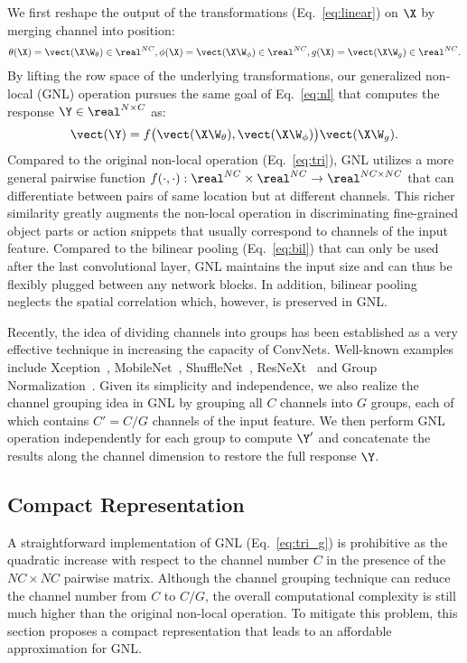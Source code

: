 \documentclass{article}
\begin{document}
We first reshape the output of the transformations (Eq.~\ref{eq:linear}) on $\X$ by merging channel into position:
\begin{align}
  \label{eq:linear_g}
  \theta(\X) = \vect(\X \W_\theta) \in \real^{NC}, \phi(\X) = \vect(\X \W_\phi) \in \real^{NC}, g(\X) = \vect(\X \W_g) \in \real^{NC} .
\end{align}
By lifting the row space of the underlying transformations, our generalized non-local (GNL) operation pursues the same goal of Eq.~\ref{eq:nl} that computes the response $\Y \in \real^{N \times C}$ as:
\begin{align}
  \label{eq:tri_g}
  \vect(\Y) = f \big( \vect(\X \W_\theta), \vect(\X \W_\phi) \big) \vect(\X \W_g).
\end{align}
Compared to the original non-local operation (Eq.~\ref{eq:tri}), GNL utilizes a more general pairwise function $f(\cdot, \cdot): \real^{NC} \times \real^{NC} \rightarrow \real^{NC \times NC}$ that can differentiate between pairs of same location but at different channels.
This richer similarity greatly augments the non-local operation in discriminating fine-grained object parts or action snippets that usually correspond to channels of the input feature.
Compared to the bilinear pooling (Eq.~\ref{eq:bil}) that can only be used after the last convolutional layer, GNL maintains the input size and can thus be flexibly plugged between any network blocks.
In addition, bilinear pooling neglects the spatial correlation which, however, is preserved in GNL.

Recently, the idea of dividing channels into groups has been established as a very effective technique in increasing the capacity of ConvNets.
Well-known examples include Xception~\cite{xception}, MobileNet~\cite{mobilenet}, ShuffleNet~\cite{shufflenet}, ResNeXt~\cite{resnext} and Group Normalization~\cite{gn}.
Given its simplicity and independence, we also realize the channel grouping idea in GNL by grouping all $C$ channels into $G$ groups, each of which contains $C'=C/G$ channels of the input feature.
We then perform GNL operation independently for each group to compute $\Y'$ and concatenate the results along the channel dimension to restore the full response $\Y$.
\subsection{Compact Representation}
\label{subsect:compact represnetation}
A straightforward implementation of GNL (Eq.~\ref{eq:tri_g}) is prohibitive as the quadratic increase with respect to the channel number $C$ in the presence of the $NC \times NC$ pairwise matrix.
Although the channel grouping technique can reduce the channel number from $C$ to $C/G$, the overall computational complexity is still much higher than the original non-local operation.
To mitigate this problem, this section proposes a compact representation that leads to an affordable approximation for GNL.
\end{document}
